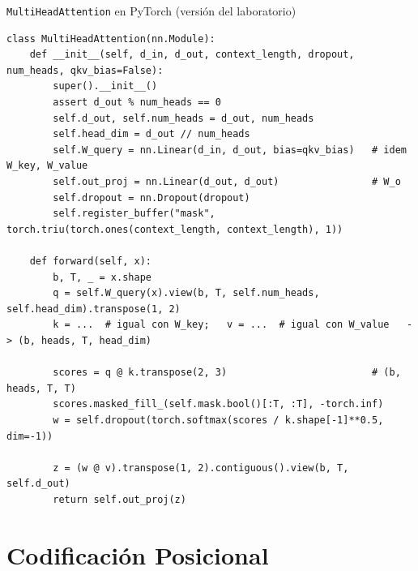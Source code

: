 \documentclass[aspectratio=169, 10pt]{beamer}
\begin{document}
\begin{frame}[fragile]{\texttt{MultiHeadAttention} en PyTorch (versi\'on del laboratorio)}
	\scriptsize
	\begin{tcolorbox}[colback=LightGray, colframe=UCMNavy, arc=3pt, boxsep=1pt]
\begin{verbatim}
class MultiHeadAttention(nn.Module):
    def __init__(self, d_in, d_out, context_length, dropout, num_heads, qkv_bias=False):
        super().__init__()
        assert d_out % num_heads == 0
        self.d_out, self.num_heads = d_out, num_heads
        self.head_dim = d_out // num_heads
        self.W_query = nn.Linear(d_in, d_out, bias=qkv_bias)   # idem W_key, W_value
        self.out_proj = nn.Linear(d_out, d_out)                # W_o
        self.dropout = nn.Dropout(dropout)
        self.register_buffer("mask", torch.triu(torch.ones(context_length, context_length), 1))

    def forward(self, x):
        b, T, _ = x.shape
        q = self.W_query(x).view(b, T, self.num_heads, self.head_dim).transpose(1, 2)
        k = ...  # igual con W_key;   v = ...  # igual con W_value   -> (b, heads, T, head_dim)

        scores = q @ k.transpose(2, 3)                         # (b, heads, T, T)
        scores.masked_fill_(self.mask.bool()[:T, :T], -torch.inf)
        w = self.dropout(torch.softmax(scores / k.shape[-1]**0.5, dim=-1))

        z = (w @ v).transpose(1, 2).contiguous().view(b, T, self.d_out)
        return self.out_proj(z)
\end{verbatim}
	\end{tcolorbox}
\end{frame}

\section{Codificaci\'on Posicional}
\end{document}
